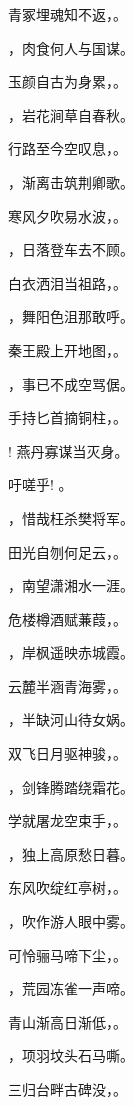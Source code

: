 \documentclass[12pt, a4paper, addpoints]{exam}
\begin{document}
\begin{questions}
\question[1] 青冢埋魂知不返，\uline{\qquad\qquad\qquad}。

\question[1] \uline{\qquad\qquad\qquad}，肉食何人与国谋。

\question[1] 玉颜自古为身累，\uline{\qquad\qquad\qquad}。

\question[1] \uline{\qquad\qquad\qquad}，岩花涧草自春秋。

\question[1] 行路至今空叹息，\uline{\qquad\qquad\qquad}。

\question[1] \uline{\qquad\qquad\qquad}，渐离击筑荆卿歌。

\question[1] 寒风夕吹易水波，\uline{\qquad\qquad\qquad}。

\question[1] \uline{\qquad\qquad\qquad}，日落登车去不顾。

\question[1] 白衣洒泪当祖路，\uline{\qquad\qquad\qquad}。

\question[1] \uline{\qquad\qquad\qquad}，舞阳色沮那敢呼。

\question[1] 秦王殿上开地图，\uline{\qquad\qquad\qquad}。

\question[1] \uline{\qquad\qquad\qquad}，事已不成空骂倨。

\question[1] 手持匕首摘铜柱，\uline{\qquad\qquad\qquad}。

\question[1] \uline{\qquad\qquad\qquad}! 燕丹寡谋当灭身。

\question[1] 吁嗟乎! \uline{\qquad\qquad\qquad}。

\question[1] \uline{\qquad\qquad\qquad}，惜哉枉杀樊将军。

\question[1] 田光自刎何足云，\uline{\qquad\qquad\qquad}。

\question[1] \uline{\qquad\qquad\qquad}，南望潇湘水一涯。

\question[1] 危楼樽酒赋蒹葭，\uline{\qquad\qquad\qquad}。

\question[1] \uline{\qquad\qquad\qquad}，岸枫遥映赤城霞。

\question[1] 云麓半涵青海雾，\uline{\qquad\qquad\qquad}。

\question[1] \uline{\qquad\qquad\qquad}，半缺河山待女娲。

\question[1] 双飞日月驱神骏，\uline{\qquad\qquad\qquad}。

\question[1] \uline{\qquad\qquad\qquad}，剑锋腾踏绕霜花。

\question[1] 学就屠龙空束手，\uline{\qquad\qquad\qquad}。

\question[1] \uline{\qquad\qquad\qquad}，独上高原愁日暮。

\question[1] 东风吹绽红亭树，\uline{\qquad\qquad\qquad}。

\question[1] \uline{\qquad\qquad\qquad}，吹作游人眼中雾。

\question[1] 可怜骊马啼下尘，\uline{\qquad\qquad\qquad}。

\question[1] \uline{\qquad\qquad\qquad}，荒园冻雀一声啼。

\question[1] 青山渐高日渐低，\uline{\qquad\qquad\qquad}。

\question[1] \uline{\qquad\qquad\qquad}，项羽坟头石马嘶。

\question[1] 三归台畔古碑没，\uline{\qquad\qquad\qquad}。

\end{questions}
\end{document}
